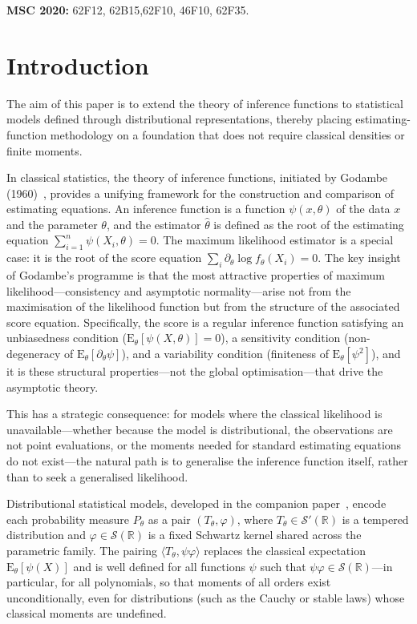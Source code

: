 \documentclass[11pt,a4paper]{article}
\newcommand{\E}{\mathrm{E}}
\newcommand{\R}{\mathbb{R}}
\begin{document}
\smallskip
\noindent
\textbf{MSC 2020:} 62F12, 62B15,62F10, 46F10, 62F35.

\normalsize

\newpage
\tableofcontents
\newpage


\section{Introduction}\label{sec:introduction}
The aim of this paper is to extend the theory of inference functions
to statistical models defined through distributional representations,
thereby placing estimating-function methodology on a foundation that
does not require classical densities or finite moments.

In classical statistics, the theory of inference functions, initiated by
Godambe (1960)~\cite{Godambe1960}, provides a unifying framework for the
construction and comparison of estimating equations. An inference function is a function
$\psi(x, \theta)$ of the data $x$ and the parameter $\theta$, and the
estimator $\hat\theta$ is defined as the root of the estimating equation
$\sum_{i=1}^n \psi(X_i, \theta) = 0$.  The maximum likelihood estimator
is a special case: it is the root of the score equation
$\sum_i \partial_\theta \log f_\theta(X_i) = 0$.  The key insight of
Godambe's programme is that the most attractive properties of maximum
likelihood---consistency and asymptotic normality---arise not from
the maximisation of the likelihood function but from the structure of the
associated score equation.  Specifically, the score is a regular inference
function satisfying an unbiasedness condition
($\E_\theta[\psi(X, \theta)] = 0$), a sensitivity condition
(non-degeneracy of $\E_\theta[\partial_\theta \psi]$), and a variability
condition (finiteness of $\E_\theta[\psi^2]$), and it is these structural
properties---not the global optimisation---that drive the asymptotic
theory.

This has a strategic consequence: for models where the classical
likelihood is unavailable---whether because the model is
distributional, the observations are not point evaluations, or the
moments needed for standard estimating equations do not exist---the
natural path is to generalise the inference function itself, rather
than to seek a generalised likelihood.

Distributional statistical models, developed in the companion
paper~\cite{LabouriauA1}, encode each probability measure $P_\theta$ as a
pair $(T_\theta, \varphi)$, where $T_\theta \in \mathcal S'(\R)$ is a
tempered distribution and $\varphi \in \mathcal S(\R)$ is a fixed Schwartz
kernel shared across the parametric family.  The pairing
$\langle T_\theta, \psi\varphi \rangle$ replaces the classical expectation
$\E_\theta[\psi(X)]$ and is well defined for all functions $\psi$ such
that $\psi\varphi \in \mathcal S(\R)$---in particular, for all
polynomials, so that moments of all orders exist unconditionally, even for
distributions (such as the Cauchy or stable laws) whose classical moments
are undefined.
\end{document}
